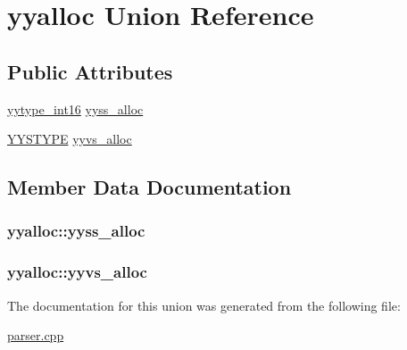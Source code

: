 \hypertarget{unionyyalloc}{}\section{yyalloc Union Reference}
\label{unionyyalloc}
\subsection*{Public Attributes}
\begin{DoxyCompactItemize}
\item 
\hyperlink{parser_8cpp_ade5b97f0021a4f6c5922ead3744ab297}{yytype\+\_\+int16} \hyperlink{unionyyalloc_a4800e0520a89a4789afa7b5d82197e65}{yyss\+\_\+alloc}
\item 
\hyperlink{unionYYSTYPE}{Y\+Y\+S\+T\+Y\+P\+E} \hyperlink{unionyyalloc_a9326f4fdc6f737a929444427836d8928}{yyvs\+\_\+alloc}
\end{DoxyCompactItemize}


\subsection{Member Data Documentation}
\hypertarget{unionyyalloc_a4800e0520a89a4789afa7b5d82197e65}{}
\subsubsection[{yyss\+\_\+alloc}]{ yyalloc\+::yyss\+\_\+alloc}\label{unionyyalloc_a4800e0520a89a4789afa7b5d82197e65}
\hypertarget{unionyyalloc_a9326f4fdc6f737a929444427836d8928}{}
\subsubsection[{yyvs\+\_\+alloc}]{ yyalloc\+::yyvs\+\_\+alloc}\label{unionyyalloc_a9326f4fdc6f737a929444427836d8928}


The documentation for this union was generated from the following file\+:\begin{DoxyCompactItemize}
\item 
\hyperlink{parser_8cpp}{parser.\+cpp}\end{DoxyCompactItemize}
